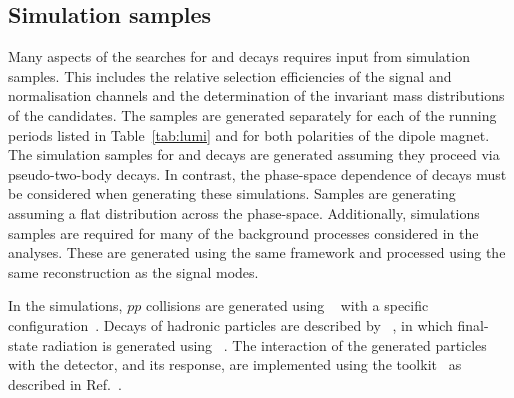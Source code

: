 \subsection{Simulation samples}
\label{sec:mc}

Many aspects of the searches for \decay{\Bp}{\Dsp\phiz} and \decay{\Bp}{\Dsp\Kp\Km} decays requires input from simulation samples. This includes the relative selection efficiencies of the signal and normalisation channels and the determination of the invariant mass distributions of the candidates.
The samples are generated separately for each of the running periods listed in Table~\ref{tab:lumi} and for both polarities of the \lhcb dipole magnet. The simulation samples for \decay{\Bp}{\Dsp\phiz} and \decay{\Bp}{\Dsp\Dzb} decays are generated assuming they proceed via pseudo-two-body decays. In contrast, the phase-space dependence of \decay{\Bp}{\Dsp\Kp\Km} decays must be considered when generating these simulations. Samples are generating assuming a flat distribution across the phase-space. 
Additionally, simulations samples are required for many of the background processes considered in the analyses. These are generated using the same framework and processed using the same reconstruction as the signal modes.


In the simulations, $pp$ collisions are generated using \pythia~\cite{Sjostrand:2007gs,Sjostrand:2006za} with a specific \lhcb configuration~\cite{LHCb-PROC-2010-056}.  Decays of hadronic particles are described by \evtgen~\cite{Lange:2001uf}, in which final-state radiation is generated using \photos~\cite{Golonka:2005pn}. The interaction of the generated particles with the detector, and its response, are implemented using the \geant toolkit~\cite{Allison:2006ve, *Agostinelli:2002hh} as described in Ref.~\cite{LHCb-PROC-2011-006}.


